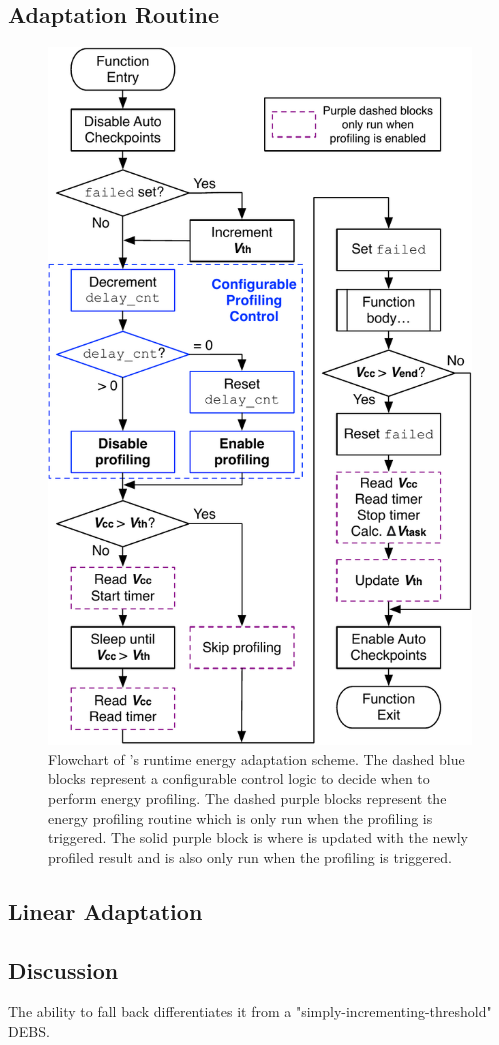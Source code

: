 \subsection{Adaptation Routine}

\begin{figure}
    \centering
    \includegraphics[width=0.8\columnwidth]{ch5_optic/figures/flowchart.pdf}
    \caption{Flowchart of \nn{}'s runtime energy adaptation scheme. The dashed blue blocks represent a configurable control logic to decide when to perform energy profiling. The dashed purple blocks represent the energy profiling routine which is only run when the profiling is triggered. The solid purple block is where  is updated with the newly profiled result and is also only run when the profiling is triggered. }
    \label{fig:opta_flowchart}
\end{figure}

\subsection{Linear Adaptation}

\subsection{Discussion}

The ability to fall back differentiates it from a "simply-incrementing-threshold" DEBS.
